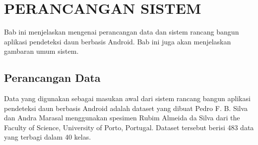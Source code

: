 \chapter{PERANCANGAN SISTEM}

Bab ini menjelaskan mengenai perancangan data dan sistem rancang bangun aplikasi pendeteksi daun berbasis Android. Bab ini juga akan menjelaskan gambaran umum sistem.

\section{Perancangan Data}
\par Data yang digunakan sebagai masukan awal dari sistem rancang bangun aplikasi pendeteksi daun berbasis Android adalah dataset yang dibuat Pedro F. B. Silva dan Andra Marasal menggunakan spesimen Rubim Almeida da Silva dari the Faculty of Science, University of Porto, Portugal. Dataset tersebut berisi 483 data yang terbagi dalam 40 kelas. 

